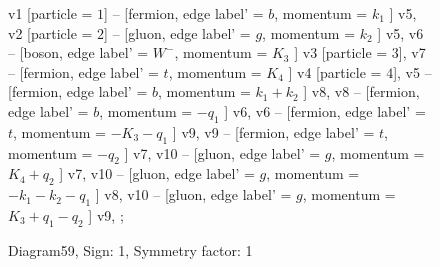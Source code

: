 \documentclass{revtex4}
\begin{document}
\begin{figure}[!htb]
\begin{center}
{    %
v1 [particle = \(1\)] -- [fermion, edge label' = \(b\), momentum = \(k_{1}\) ] v5, 
v2 [particle = \(2\)] -- [gluon, edge label' = \(g\), momentum = \(k_{2}\) ] v5, 
v6 -- [boson, edge label' = \(W^{-}\), momentum = \(K_{3}\) ] v3 [particle = \(3\)], 
v7 -- [fermion, edge label' = \(t\), momentum = \(K_{4}\) ] v4 [particle = \(4\)], 
v5 -- [fermion, edge label' = \(b\), momentum = \(k_{1} + k_{2}\) ] v8, 
v8 -- [fermion, edge label' = \(b\), momentum = \(-q_{1}\) ] v6, 
v6 -- [fermion, edge label' = \(t\), momentum = \(-K_{3} - q_{1}\) ] v9, 
v9 -- [fermion, edge label' = \(t\), momentum = \(-q_{2}\) ] v7, 
v10 -- [gluon, edge label' = \(g\), momentum = \(K_{4} + q_{2}\) ] v7, 
v10 -- [gluon, edge label' = \(g\), momentum = \(-k_{1} - k_{2} - q_{1}\) ] v8, 
v10 -- [gluon, edge label' = \(g\), momentum = \(K_{3} + q_{1} - q_{2}\) ] v9, 
};
\end{center}
\caption{Diagram59, Sign: 1, Symmetry factor: 1}
\end{figure}
\newpage
\end{document}
